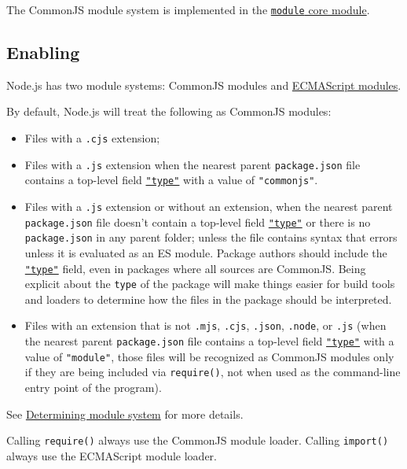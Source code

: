 The CommonJS module system is implemented in the
\href{module.md}{\texttt{module} core module}.

\subsection{Enabling}\label{enabling}

Node.js has two module systems: CommonJS modules and
\href{esm.md}{ECMAScript modules}.

By default, Node.js will treat the following as CommonJS modules:

\begin{itemize}
\item
  Files with a \texttt{.cjs} extension;
\item
  Files with a \texttt{.js} extension when the nearest parent
  \texttt{package.json} file contains a top-level field
  \href{packages.md\#type}{\texttt{"type"}} with a value of
  \texttt{"commonjs"}.
\item
  Files with a \texttt{.js} extension or without an extension, when the
  nearest parent \texttt{package.json} file doesn't contain a top-level
  field \href{packages.md\#type}{\texttt{"type"}} or there is no
  \texttt{package.json} in any parent folder; unless the file contains
  syntax that errors unless it is evaluated as an ES module. Package
  authors should include the \href{packages.md\#type}{\texttt{"type"}}
  field, even in packages where all sources are CommonJS. Being explicit
  about the \texttt{type} of the package will make things easier for
  build tools and loaders to determine how the files in the package
  should be interpreted.
\item
  Files with an extension that is not \texttt{.mjs}, \texttt{.cjs},
  \texttt{.json}, \texttt{.node}, or \texttt{.js} (when the nearest
  parent \texttt{package.json} file contains a top-level field
  \href{packages.md\#type}{\texttt{"type"}} with a value of
  \texttt{"module"}, those files will be recognized as CommonJS modules
  only if they are being included via \texttt{require()}, not when used
  as the command-line entry point of the program).
\end{itemize}

See \href{packages.md\#determining-module-system}{Determining module
system} for more details.

Calling \texttt{require()} always use the CommonJS module loader.
Calling \texttt{import()} always use the ECMAScript module loader.

